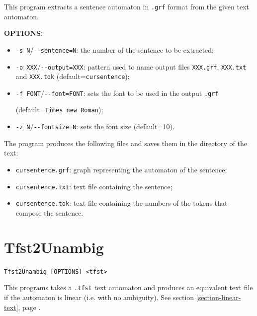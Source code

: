 \bigskip
\noindent This program extracts a sentence automaton in \verb+.grf+ format from
the given text automaton. 

\bigskip
\noindent \textbf{OPTIONS:}
\begin{itemize}
  \item \verb+-s N+/\verb+--sentence=N+: the number of the sentence to be
  extracted;
  
  \item \verb+-o XXX+/\verb+--output=XXX+: pattern used to name output files 
 \verb+XXX.grf+, \verb+XXX.txt+ and \verb+XXX.tok+ (default=\verb+cursentence+);
 
  \item \verb+-f FONT+/\verb+--font=FONT+: sets the font to be used in the
  output \verb+.grf+
   
  (default=\verb+Times new Roman+);
  \item \verb+-z N+/\verb+--fontsize=N+: sets the font size (default=10).
\end{itemize}

\bigskip
\noindent The program produces the following files and saves them in the
directory of the text:

\begin{itemize}
  \item \verb+cursentence.grf+: graph representing the automaton of the
  sentence;

  \item \verb+cursentence.txt+: text file containing the
  sentence;

  \item \verb+cursentence.tok+: text file containing the
  numbers of the tokens that compose the
  sentence.
\end{itemize}







\section{Tfst2Unambig}
\verb+Tfst2Unambig [OPTIONS] <tfst>+

\bigskip
\noindent This programs takes a \verb$.tfst$ text automaton and produces an
equivalent text file if the automaton is linear (i.e. with no
ambiguity). See section \ref{section-linear-text}, page \pageref{section-linear-text}.

